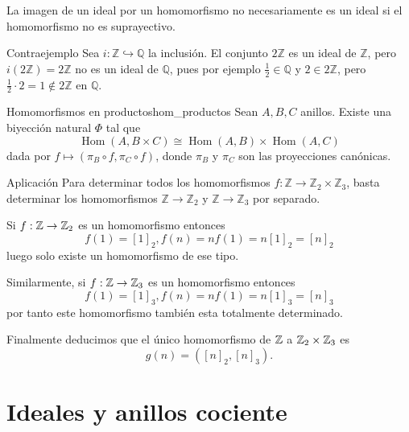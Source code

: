 \begin{remark}
    La imagen de un ideal por un homomorfismo no necesariamente es un ideal si el homomorfismo no es suprayectivo.
\end{remark}

\begin{example}{Contraejemplo}{}
    Sea \(i: \mathbb{Z} \hookrightarrow \mathbb{Q}\) la inclusión. El conjunto \(2\mathbb{Z}\) es un ideal de \(\mathbb{Z}\), pero \(i(2\mathbb{Z}) = 2\mathbb{Z}\) no es un ideal de \(\mathbb{Q}\), pues por ejemplo \(\frac{1}{2} \in \mathbb{Q}\) y \(2 \in 2\mathbb{Z}\), pero \(\frac{1}{2} \cdot 2 = 1 \notin 2\mathbb{Z}\) en \(\mathbb{Q}\).
\end{example}

\begin{theorem}{Homomorfismos en productos}{hom_productos}
    Sean \(A, B, C\) anillos. Existe una biyección natural $\Phi$ tal que
    \[
    \operatorname{Hom}(A, B \times C) \cong \operatorname{Hom}(A, B) \times \operatorname{Hom}(A, C)
    \]
    dada por \(f \mapsto (\pi_B \circ f, \pi_C \circ f)\), donde \(\pi_B\) y \(\pi_C\) son las proyecciones canónicas.
\end{theorem}

\begin{example}{Aplicación}{}
    Para determinar todos los homomorfismos \(f: \mathbb{Z} \to \mathbb{Z}_2 \times \mathbb{Z}_3\), basta determinar los homomorfismos \(\mathbb{Z} \to \mathbb{Z}_2\) y \(\mathbb{Z} \to \mathbb{Z}_3\) por separado.
\end{example}

\begin{proofbox}
    Si $f : \mathbb{Z} \to \mathbb{Z}_2$ es un homomorfismo entonces
    \[
    f(1) = [1]_2, f(n) = nf(1) = n[1]_2 = [n]_2
    \]
    luego solo existe un homomorfismo de ese tipo.

    Similarmente, si $f : \mathbb{Z} \to \mathbb{Z}_3$ es un homomorfismo entonces
    \[
    f(1) = [1]_3, f(n) = nf(1) = n[1]_3 = [n]_3
    \]
    por tanto este homomorfismo también esta totalmente determinado.

    Finalmente deducimos que el único homomorfismo de $\mathbb{Z}$ a $\mathbb{Z}_2 \times \mathbb{Z}_3$ es 
    \[
    g(n) = ([n]_2, [n]_3).
    \]
\end{proofbox}

\clearpage
\section{Ideales y anillos cociente}

